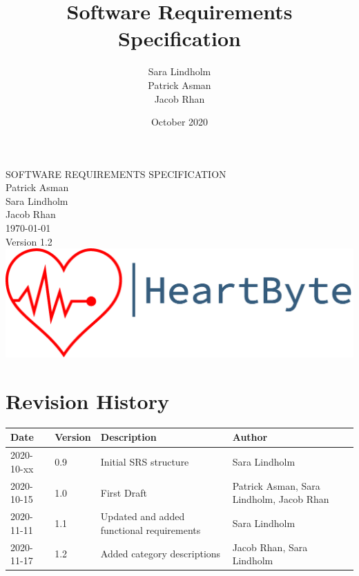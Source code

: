 \documentclass{scrreprt}
\title{Software Requirements Specification}
\author{Sara Lindholm \\ Patrick Asman \\ Jacob Rhan}
\date{October 2020}
\def\myversion{1.2}
\begin{document}
\begin{titlepage}
    \begin{center}
    \begin{bfseries}
        \Huge{SOFTWARE REQUIREMENTS SPECIFICATION}\\
        \vspace{1.5cm}
        \LARGE Patrick Asman \\ Sara Lindholm \\ Jacob Rhan \\
        \vspace{1.5cm}
        \today\\
        \vspace{1.5cm}
        {Version \myversion}\\
        \vfill
        \includegraphics[width=\linewidth]{Pictures/logo.png} \\
    \end{bfseries}
    \end{center}
\end{titlepage}

\tableofcontents

\chapter*{Revision History}
\begin{center}
\begin{tabular}{|p{}|p{}|p{6cm}|p{4cm}|}
 \hline
 \textbf{Date} & \textbf{Version} & \textbf{Description} & \textbf{Author} \\ 
 \hline
 2020-10-xx & 0.9 & Initial SRS structure & Sara Lindholm \\
 \hline
 2020-10-15 & 1.0 & First Draft & Patrick Asman, Sara Lindholm, Jacob Rhan \\ 
 \hline
 2020-11-11 & 1.1 & Updated and added functional requirements & Sara Lindholm \\
 \hline
 2020-11-17 & 1.2 & Added category descriptions & Jacob Rhan, Sara Lindholm\\
 \hline
\end{tabular}
\end{center}
\end{document}
